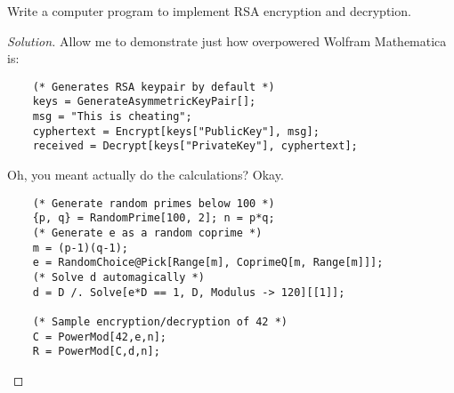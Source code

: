 \documentclass{agony}
\begin{document}
\question Write a computer program to implement RSA encryption and decryption.
\begin{proof}[Solution]
  Allow me to demonstrate just how overpowered Wolfram Mathematica is:
  \begin{verbatim}
    (* Generates RSA keypair by default *)
    keys = GenerateAsymmetricKeyPair[];
    msg = "This is cheating";
    cyphertext = Encrypt[keys["PublicKey"], msg];
    received = Decrypt[keys["PrivateKey"], cyphertext];
  \end{verbatim}
  Oh, you meant actually do the calculations? Okay.
  \begin{verbatim}
    (* Generate random primes below 100 *)
    {p, q} = RandomPrime[100, 2]; n = p*q;
    (* Generate e as a random coprime *)
    m = (p-1)(q-1);
    e = RandomChoice@Pick[Range[m], CoprimeQ[m, Range[m]]];
    (* Solve d automagically *)
    d = D /. Solve[e*D == 1, D, Modulus -> 120][[1]];

    (* Sample encryption/decryption of 42 *)
    C = PowerMod[42,e,n];
    R = PowerMod[C,d,n];
  \end{verbatim}
\end{proof}
\end{document}
